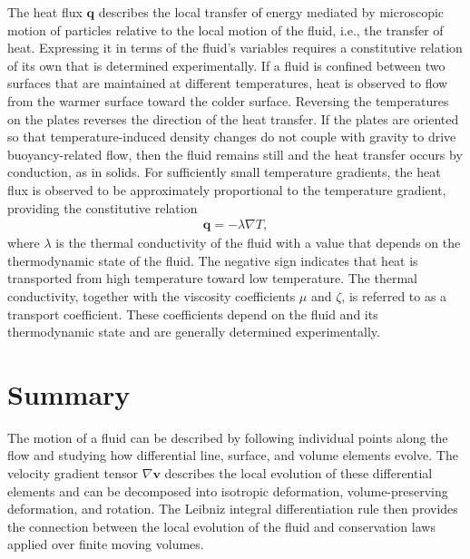 The heat flux $\bm{q}$ describes the local transfer of energy mediated by microscopic motion of particles relative to the local motion of the fluid, i.e., the transfer of heat. Expressing it in terms of the fluid's variables requires a constitutive relation of its own that is determined experimentally. If a fluid is confined between two surfaces that are maintained at different temperatures, heat is observed to flow from the warmer surface toward the colder surface. Reversing the temperatures on the plates reverses the direction of the heat transfer. If the plates are oriented so that temperature-induced density changes do not couple with gravity to drive buoyancy-related flow, then the fluid remains still and the heat transfer occurs by conduction, as in solids. For sufficiently small temperature gradients, the heat flux is observed to be approximately proportional to the temperature gradient, providing the constitutive relation
\begin{align}
    \bm{q}=-\lambda\nabla T,
    \label{eq:fourier-law}
\end{align}
where $\lambda$ is the thermal conductivity of the fluid with a value that depends on the thermodynamic state of the fluid. The negative sign indicates that heat is transported from high temperature toward low temperature. The thermal conductivity, together with the viscosity coefficients $\mu$ and $\zeta$, is referred to as a transport coefficient. These coefficients depend on the fluid and its thermodynamic state and are generally determined experimentally.

\section{Summary}
The motion of a fluid can be described by following individual points along the flow and studying how differential line, surface, and volume elements evolve. The velocity gradient tensor $\nabla\bm{v}$ describes the local evolution of these differential elements and can be decomposed into isotropic deformation, volume-preserving deformation, and rotation. The Leibniz integral differentiation rule then provides the connection
between the local evolution of the fluid and conservation laws applied over finite moving volumes.

